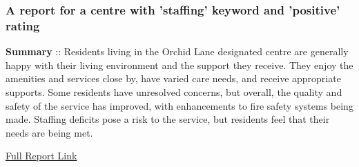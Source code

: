 \documentclass[a4paper,11pt,twoside]{article}
\begin{document}
\subsubsection{A report for a centre with 'staffing' keyword and 'positive' rating}
\label{sec:org7aebc2f}

\textbf{Summary} :: Residents living in the Orchid Lane designated centre are generally happy with their living environment and the support they receive. They enjoy the amenities and services close by, have varied care needs, and receive appropriate supports. Some residents have unresolved concerns, but overall, the quality and safety of the service has improved, with enhancements to fire safety systems being made. Staffing deficits pose a risk to the service, but residents feel that their needs are being met.

\href{https://www.hiqa.ie/system/files?file=inspectionreports/5052-orchid-lane-04-april-2023.pdf}{Full Report Link}
\end{document}
